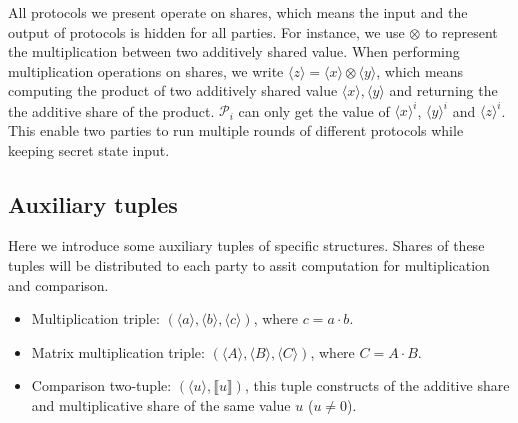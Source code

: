 \documentclass[letterpaper]{article} %
\begin{document}
    All protocols we present operate on shares, which means 
    the input and the output of protocols is hidden for all parties.
    For instance, we use $\otimes$ to represent the multiplication between two additively shared value.   
    When performing multiplication operations on shares, 
    we write $\langle z\rangle=\langle x\rangle\otimes  \langle y\rangle $,
    which means computing the product of two additively shared value $\langle x\rangle, \langle y\rangle$ and returning the 
    the additive share of the product. 
    $\mathcal{P}_{i}$ can only get the value of $\langle x\rangle ^{i}$, $\langle y\rangle ^{i}$ and $\langle z\rangle ^{i}$.
    This enable two parties to run multiple rounds of different protocols
    while keeping secret state input.

    \subsection{Auxiliary tuples}
    Here we introduce some auxiliary tuples of specific structures. 
    Shares of these tuples will be distributed to each party to 
    assit computation for multiplication and comparison. 
    \begin{itemize}
        \item Multiplication triple: $(\langle a\rangle,\langle b\rangle,\langle c\rangle)$, where $c=a\cdot b$.
        \item Matrix multiplication triple: $(\langle A\rangle,\langle B\rangle,\langle C\rangle)$, where $C=A\cdot B$.
        \item Comparison two-tuple: $(\langle u\rangle,\llbracket u \rrbracket)$, 
        this tuple constructs of the additive share and multiplicative share of the same value $u$ ($u\neq 0 $).
    \end{itemize}
    
    
\end{document}
